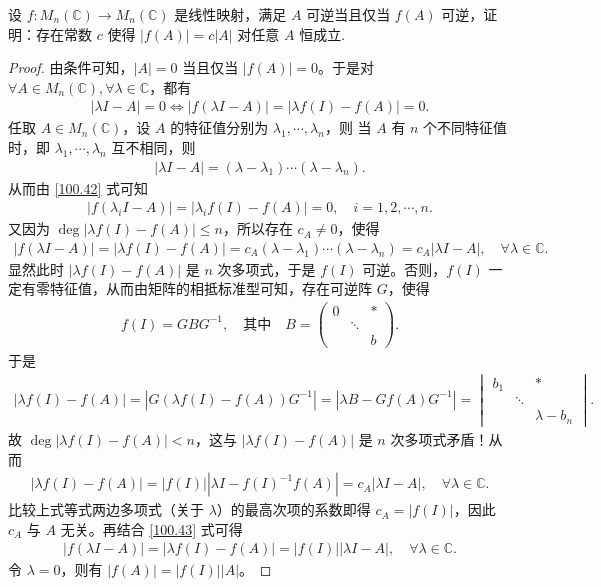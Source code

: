\documentclass[../../main.tex]{subfiles}%
\begin{document}
\begin{example}
设 $f: M_n(\mathbb{C}) \to M_n(\mathbb{C})$ 是线性映射，满足 $A$ 可逆当且仅当 $f(A)$ 可逆，证明：存在常数 $c$ 使得 $|f(A)| = c|A|$ 对任意 $A$ 恒成立. 
\end{example}
\begin{proof}

由条件可知，$|A| = 0$ 当且仅当 $|f(A)| = 0$。于是对 $\forall A \in M_n(\mathbb{C}), \forall \lambda \in \mathbb{C}$，都有
\begin{align}
|\lambda I - A| = 0 \Longleftrightarrow |f(\lambda I - A)| = |\lambda f(I) - f(A)| = 0. \label{100.42}
\end{align}
任取 $A \in M_n(\mathbb{C})$，设 $A$ 的特征值分别为 $\lambda_1, \cdots, \lambda_n$，则
当 $A$ 有 $n$ 个不同特征值时，即 $\lambda_1, \cdots, \lambda_n$ 互不相同，则
\begin{align*}
|\lambda I - A| = (\lambda - \lambda_1) \cdots (\lambda - \lambda_n).
\end{align*}
从而由 \eqref{100.42} 式可知
\begin{align*}
|f(\lambda_i I - A)| = |\lambda_i f(I) - f(A)| = 0, \quad i = 1, 2, \cdots, n.
\end{align*}
又因为 $\deg |\lambda f(I) - f(A)| \leqslant n$，所以存在 $c_A \ne 0$，使得
\begin{align}
|f(\lambda I - A)| = |\lambda f(I) - f(A)| = c_A (\lambda - \lambda_1) \cdots (\lambda - \lambda_n) = c_A |\lambda I - A|, \quad \forall \lambda \in \mathbb{C}. \label{100.43}
\end{align}
显然此时 $|\lambda f(I) - f(A)|$ 是 $n$ 次多项式，于是 $f(I)$ 可逆。否则，$f(I)$ 一定有零特征值，从而由矩阵的相抵标准型可知，存在可逆阵 $G$，使得
\begin{align*}
f(I) = G B G^{-1}, \quad \text{其中} \quad B = \begin{pmatrix}
0 & & * \\
& \ddots & \\
& & b
\end{pmatrix}.
\end{align*}
于是
\begin{align*}
|\lambda f(I) - f(A)| = |G (\lambda f(I) - f(A)) G^{-1}| = |\lambda B - G f(A) G^{-1}| = \begin{vmatrix}
b_1 & & * \\
& \ddots & \\
& & \lambda - b_n
\end{vmatrix}.
\end{align*}
故 $\deg |\lambda f(I) - f(A)| < n$，这与 $|\lambda f(I) - f(A)|$ 是 $n$ 次多项式矛盾！从而
\begin{align*}
|\lambda f(I) - f(A)| = |f(I)| |\lambda I - f(I)^{-1} f(A)| = c_A |\lambda I - A|, \quad \forall \lambda \in \mathbb{C}.
\end{align*}
比较上式等式两边多项式（关于 $\lambda$）的最高次项的系数即得 $c_A = |f(I)|$，因此 $c_A$ 与 $A$ 无关。再结合 \eqref{100.43} 式可得
\begin{align*}
|f(\lambda I - A)| = |\lambda f(I) - f(A)| = |f(I)| |\lambda I - A|, \quad \forall \lambda \in \mathbb{C}.
\end{align*}
令 $\lambda = 0$，则有 $|f(A)| = |f(I)| |A|$。


\end{proof}
\end{document}
